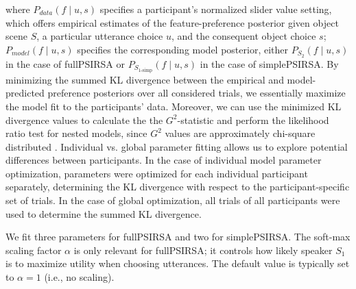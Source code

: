 \documentclass[11pt,a4paper]{article}
\begin{document}
\noindent where $P_{data}(f\mid u,s)$ specifies a participant's normalized slider value setting, which offers empirical estimates of the feature-preference posterior given object scene $S$, a particular utterance choice $u$, and the consequent object choice $s$;
$P_{model}(f\mid u,s)$ specifies the corresponding model posterior, either $P_{S_{2}}(f\mid u,s)$ in the case of fullPSIRSA or $P_{S_{1\textrm{-simp}}}(f\mid u,s)$ in the case of simplePSIRSA. 
By minimizing the summed KL divergence between the empirical and model-predicted preference posteriors over all considered trials, we essentially maximize the model fit to the participants' data. 
Moreover, we can use the minimized KL divergence values to calculate the the $G^2$-statistic and perform the likelihood ratio test for nested models, since $G^2$ values are approximately chi-square distributed \cite{Lewandowsky:2011}. 
Individual vs. global parameter fitting allows us to explore potential differences between participants.
In the case of individual model parameter optimization, parameters were optimized for each individual participant separately, determining the KL divergence with respect to the participant-specific set of trials. 
In the case of global optimization, all trials of all participants were used to determine the summed KL divergence.

We fit three parameters for fullPSIRSA and two for simplePSIRSA.
The soft-max scaling factor $\alpha$ is only relevant for fullPSIRSA; it  controls how likely speaker $S_1$ is to maximize utility when choosing utterances. 
The default value is typically set to $\alpha=1$ (i.e., no scaling). 
\end{document}
